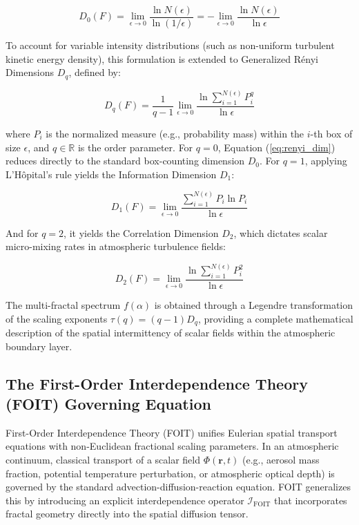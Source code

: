 \documentclass[11pt,a4paper]{article}
\begin{document}
\begin{equation}
D_0(F) = \lim_{\epsilon \to 0} \frac{\ln N(\epsilon)}{\ln(1/\epsilon)} = -\lim_{\epsilon \to 0} \frac{\ln N(\epsilon)}{\ln \epsilon}
\label{eq:box_counting}
\end{equation}

To account for variable intensity distributions (such as non-uniform turbulent kinetic energy density), this formulation is extended to Generalized Rényi Dimensions $D_q$, defined by:

\begin{equation}
D_q(F) = \frac{1}{q - 1} \lim_{\epsilon \to 0} \frac{\ln \sum_{i=1}^{N(\epsilon)} P_i^q}{\ln \epsilon}
\label{eq:renyi_dim}
\end{equation}

\noindent where $P_i$ is the normalized measure (e.g., probability mass) within the $i$-th box of size $\epsilon$, and $q \in \mathbb{R}$ is the order parameter. For $q=0$, Equation (\ref{eq:renyi_dim}) reduces directly to the standard box-counting dimension $D_0$. For $q=1$, applying L'Hôpital's rule yields the Information Dimension $D_1$:

\begin{equation}
D_1(F) = \lim_{\epsilon \to 0} \frac{\sum_{i=1}^{N(\epsilon)} P_i \ln P_i}{\ln \epsilon}
\label{eq:info_dim}
\end{equation}

And for $q=2$, it yields the Correlation Dimension $D_2$, which dictates scalar micro-mixing rates in atmospheric turbulence fields:

\begin{equation}
D_2(F) = \lim_{\epsilon \to 0} \frac{\ln \sum_{i=1}^{N(\epsilon)} P_i^2}{\ln \epsilon}
\label{eq:corr_dim}
\end{equation}

The multi-fractal spectrum $f(\alpha)$ is obtained through a Legendre transformation of the scaling exponents $\tau(q) = (q-1)D_q$, providing a complete mathematical description of the spatial intermittency of scalar fields within the atmospheric boundary layer.

\subsection{The First-Order Interdependence Theory (FOIT) Governing Equation}

First-Order Interdependence Theory (FOIT) unifies Eulerian spatial transport equations with non-Euclidean fractional scaling parameters. In an atmospheric continuum, classical transport of a scalar field $\Phi(\mathbf{r}, t)$ (e.g., aerosol mass fraction, potential temperature perturbation, or atmospheric optical depth) is governed by the standard advection-diffusion-reaction equation. FOIT generalizes this by introducing an explicit interdependence operator $\mathcal{I}_{\text{FOIT}}$ that incorporates fractal geometry directly into the spatial diffusion tensor.
\end{document}

